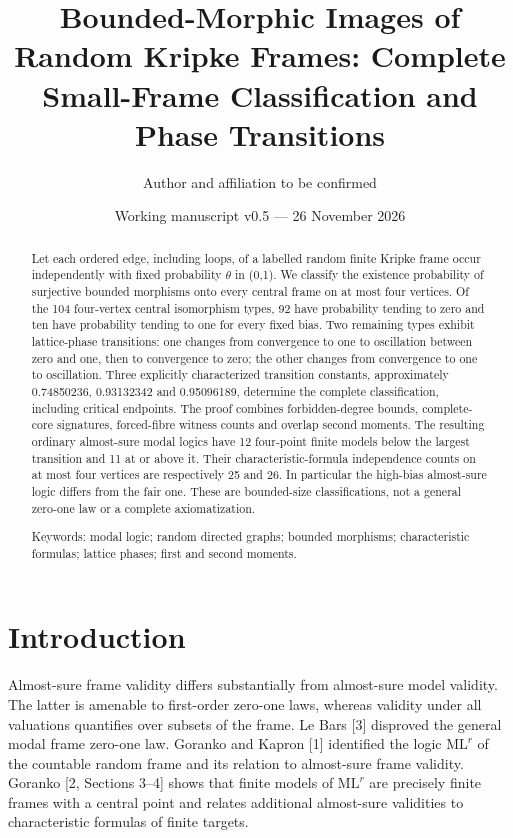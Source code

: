 \documentclass[11pt]{article}
\title{Bounded-Morphic Images of Random Kripke Frames: Complete Small-Frame Classification and Phase Transitions}
\author{Author and affiliation to be confirmed}
\date{Working manuscript v0.5 --- 26 November 2026}
\begin{document}
\maketitle
\begin{abstract}

Let each ordered edge, including loops, of a labelled random finite Kripke frame occur independently with fixed probability $\theta$ in (0,1). We classify the existence probability of surjective bounded morphisms onto every central frame on at most four vertices. Of the 104 four-vertex central isomorphism types, 92 have probability tending to zero and ten have probability tending to one for every fixed bias. Two remaining types exhibit lattice-phase transitions: one changes from convergence to one to oscillation between zero and one, then to convergence to zero; the other changes from convergence to one to oscillation. Three explicitly characterized transition constants, approximately 0.74850236, 0.93132342 and 0.95096189, determine the complete classification, including critical endpoints. The proof combines forbidden-degree bounds, complete-core signatures, forced-fibre witness counts and overlap second moments. The resulting ordinary almost-sure modal logics have 12 four-point finite models below the largest transition and 11 at or above it. Their characteristic-formula independence counts on at most four vertices are respectively 25 and 26. In particular the high-bias almost-sure logic differs from the fair one. These are bounded-size classifications, not a general zero-one law or a complete axiomatization.

Keywords: modal logic; random directed graphs; bounded morphisms; characteristic formulas; lattice phases; first and second moments.

\end{abstract}
\section{Introduction}

Almost-sure frame validity differs substantially from almost-sure model validity. The latter is amenable to first-order zero-one laws, whereas validity under all valuations quantifies over subsets of the frame. Le Bars [3] disproved the general modal frame zero-one law. Goranko and Kapron [1] identified the logic $\mathrm{ML}^r$ of the countable random frame and its relation to almost-sure frame validity. Goranko [2, Sections 3--4] shows that finite models of $\mathrm{ML}^r$ are precisely finite frames with a central point and relates additional almost-sure validities to characteristic formulas of finite targets.
\end{document}
